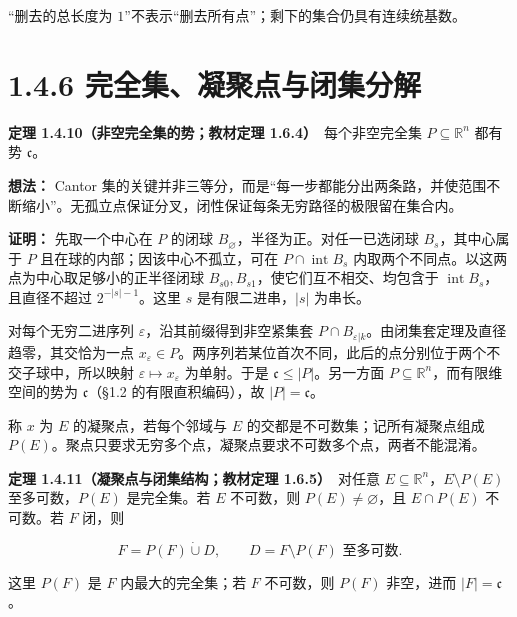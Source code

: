 \documentclass[11pt,a4paper]{article}
\begin{document}
``删去的总长度为
\(1\)''不表示``删去所有点''；剩下的集合仍具有连续统基数。

\section[\S{}1.4.6
完全集、凝聚点与闭集分解]{1.4.6
完全集、凝聚点与闭集分解}\label{ux5b8cux5168ux96c6ux51ddux805aux70b9ux4e0eux95edux96c6ux5206ux89e3}

\textbf{定理 1.4.10（非空完全集的势；教材定理 1.6.4）}　每个非空完全集
\(P\subseteq\mathbb R^n\) 都有势 \(\mathfrak c\)。

\textbf{想法：} Cantor
集的关键并非三等分，而是``每一步都能分出两条路，并使范围不断缩小''。无孤立点保证分叉，闭性保证每条无穷路径的极限留在集合内。

\textbf{证明：} 先取一个中心在 \(P\) 的闭球
\(B_\varnothing\)，半径为正。对任一已选闭球 \(B_s\)，其中心属于 \(P\)
且在球的内部；因该中心不孤立，可在 \(P\cap\operatorname{int}B_s\)
内取两个不同点。以这两点为中心取足够小的正半径闭球
\(B_{s0},B_{s1}\)，使它们互不相交、均包含于
\(\operatorname{int}B_s\)，且直径不超过 \(2^{-|s|-1}\)。这里 \(s\)
是有限二进串，\(|s|\) 为串长。

对每个无穷二进序列 \(\varepsilon\)，沿其前缀得到非空紧集套
\(P\cap B_{\varepsilon|k}\)。由闭集套定理及直径趋零，其交恰为一点
\(x_\varepsilon\in P\)。两序列若某位首次不同，此后的点分别位于两个不交子球中，所以映射
\(\varepsilon\mapsto x_\varepsilon\) 为单射。于是
\(\mathfrak c\leq|P|\)。另一方面
\(P\subseteq\mathbb R^n\)，而有限维空间的势为 \(\mathfrak c\)（§1.2
的有限直积编码），故 \(|P|=\mathfrak c\)。

称 \(x\) 为 \(E\) 的凝聚点，若每个邻域与 \(E\)
的交都是不可数集；记所有凝聚点组成
\(P(E)\)。聚点只要求无穷多个点，凝聚点要求不可数多个点，两者不能混淆。

\textbf{定理 1.4.11（凝聚点与闭集结构；教材定理 1.6.5）}　对任意
\(E\subseteq\mathbb R^n\)，\(E\setminus P(E)\) 至多可数，\(P(E)\)
是完全集。若 \(E\) 不可数，则 \(P(E)\ne\varnothing\)，且 \(E\cap P(E)\)
不可数。若 \(F\) 闭，则

\begin{equation*}
F=P(F)\mathbin{\dot\cup}D,
\qquad D=F\setminus P(F)\text{ 至多可数}.
\tag{1.4.10}
\end{equation*}

这里 \(P(F)\) 是 \(F\) 内最大的完全集；若 \(F\) 不可数，则 \(P(F)\)
非空，进而 \(|F|=\mathfrak c\)。
\end{document}
